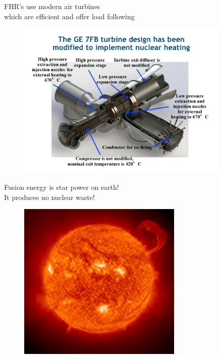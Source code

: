 \documentclass{beamer}
\begin{document}
        \begin{frame}{FHR's use modern air turbines \\ which are efficient and offer load following}
            \begin{figure}
                \centering
                \includegraphics[width=0.9\textwidth]{./img/fhrPower.png}
                \caption*{}
            \end{figure}
        \end{frame}

        \begin{frame}{Fusion energy is star power on earth! \\ It produces no nuclear waste!}
            \begin{figure}
                \centering
                \includegraphics[width=0.7\textwidth]{./img/theSun.jpg}
                \caption*{}
            \end{figure}
        \end{frame}
\end{document}
